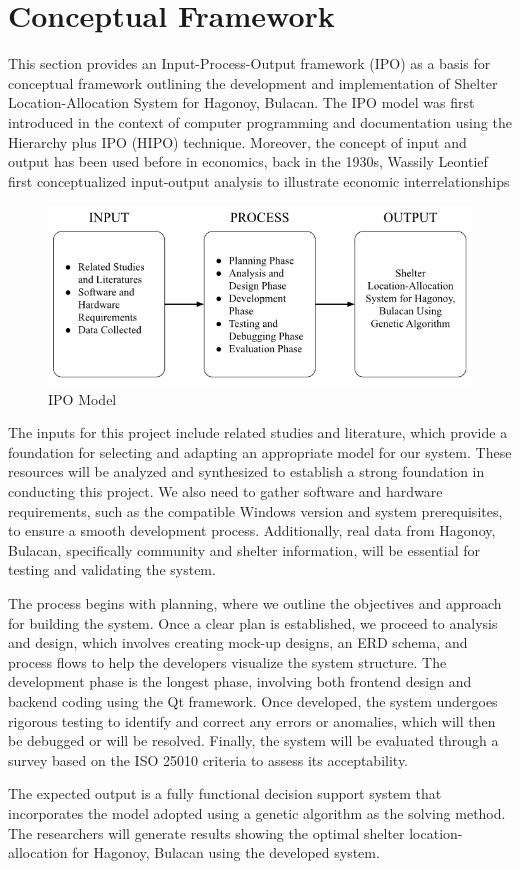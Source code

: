 \section{Conceptual Framework}

This section provides an Input-Process-Output framework (IPO) as a basis for conceptual framework outlining the development and implementation of Shelter Location-Allocation System for Hagonoy, Bulacan. The IPO model was first introduced in the context of computer programming and documentation using the Hierarchy plus IPO (HIPO) technique. Moreover, the concept of input and output has been used before in economics, back in the 1930s, Wassily Leontief first conceptualized input-output analysis to illustrate economic interrelationships
 
 \begin{figure}[h!]
 	\centering
 	\caption{IPO Model} \label{fig:ipo}
 	\includegraphics[width=\linewidth]{IPO}
 \end{figure}
 
The inputs for this project include related studies and literature, which provide a foundation for selecting and adapting an appropriate model for our system. These resources will be analyzed and synthesized to establish a strong foundation in conducting this project. We also need to gather software and hardware requirements, such as the compatible Windows version and system prerequisites, to ensure a smooth development process. Additionally, real data from Hagonoy, Bulacan, specifically community and shelter information, will be essential for testing and validating the system.

The process begins with planning, where we outline the objectives and approach for building the system. Once a clear plan is established, we proceed to analysis and design, which involves creating mock-up designs, an ERD schema, and process flows to help the developers visualize the system structure. The development phase is the longest phase, involving both frontend design and backend coding using the Qt framework. Once developed, the system undergoes rigorous testing to identify and correct any errors or anomalies, which will then be debugged or will be resolved. Finally, the system will be evaluated through a survey based on the ISO 25010 criteria to assess its acceptability.

The expected output is a fully functional decision support system that incorporates the  model adopted using a genetic algorithm as the solving method. The researchers will generate results showing the optimal shelter location-allocation for Hagonoy, Bulacan using the developed system.

 